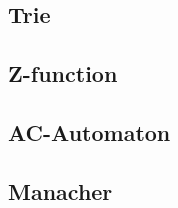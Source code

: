 \subsection{Trie}
\raggedbottom
\subsection{Z-function}
\raggedbottom
\subsection{AC-Automaton}
\raggedbottom
\subsection{Manacher}
\raggedbottom
\hrulefill
\pagebreak
